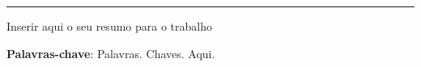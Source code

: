 
\begin{resumo}
\vspace{-0.42 cm}
\par \nobreak \hrule 
\vspace{12 pt}
\noindent
 Inserir aqui o seu resumo para o trabalho

\textbf{Palavras-chave}: Palavras. Chaves. Aqui.
\end{resumo}
\clearpage